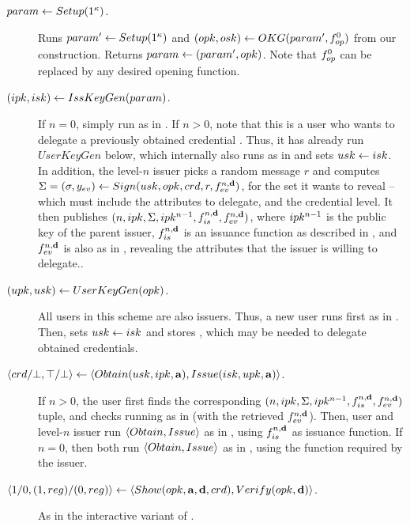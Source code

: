 \begin{description}
\item[$param \gets Setup(1^\kappa)$.]  Runs $param' \gets Setup(1^\kappa)$
    and $(opk,osk) \gets OKG(param',f_{op}^0)$ from our \CUASGen
    construction. Returns $param \gets (param',opk)$. Note that $f_{op}^0$ can
    be replaced by any desired opening function.
\item[$(ipk,isk) \gets IssKeyGen(param)$.] If $n=0$, simply run \IKeyGen as
  in \CUASAC. If $n>0$, note that this is a user who wants to delegate a
  previously obtained credential \cred. Thus, it has already run $UserKeyGen$
  below, which internally also runs \IKeyGen as in \CUASGen and sets $usk \gets
  isk$. In addition, the level-$n$ issuer picks a random message $r$ and
  computes $\Sigma = (\sigma,y_{ev}) \gets Sign(usk,opk,crd,r,
  f_{ev}^{n,\mathbf{d}})$, for the \dattrs set it wants to reveal -- which must
  include the attributes to delegate, and the credential level. It then
  publishes $(n,ipk,\Sigma,ipk^{n-1},f_{is}^{n,\mathbf{d}},f_{ev}^{n,\mathbf{d}})$,
  where $ipk^{n-1}$ is the public key of the parent issuer,
  $f_{is}^{n,\mathbf{d}}$ is an issuance function as described in
  , and $f_{ev}^{n,\mathbf{d}}$ is also as in
  , revealing the attributes that the issuer is willing to
  delegate..
\item[$(upk,usk) \gets UserKeyGen(opk)$.] All users in this scheme are
  also issuers. Thus, a new user runs first \IKeyGen as in \CUASGen. Then, sets
  $usk \gets isk$ and stores \ipk, which may be needed to delegate obtained
  credentials.
\item[$\langle crd/\bot,\top/\bot \rangle \gets
  \langle Obtain(usk,ipk,\mathbf{a}),Issue(isk,upk,\mathbf{a}) \rangle$.]
  If $n>0$, the user first finds the corresponding $(n,ipk,\Sigma,ipk^{n-1},
  f_{is}^{n,\mathbf{d}},f_{ev}^{n,\mathbf{d}})$ tuple, and checks \Sig running
  \Verify as in \CUASGen (with the retrieved $f_{ev}^{n,\mathbf{d}}$). Then,
  user and level-$n$ issuer run $\langle Obtain,Issue\rangle$ as in \CUASGen,
  using $f_{is}^{n,\mathbf{d}}$ as issuance function. If $n=0$, then both run
  $\langle Obtain,Issue\rangle$ as in \CUASGen, using the \fissue function
  required by the issuer.
\item[$\langle 1/0,(1,reg)/(0,reg)\rangle
  \gets \langle Show(opk,\mathbf{a},\mathbf{d},crd),
  Verify(opk,\mathbf{d}) \rangle$.] As in the interactive variant of \CUASGen.  
\end{description}

